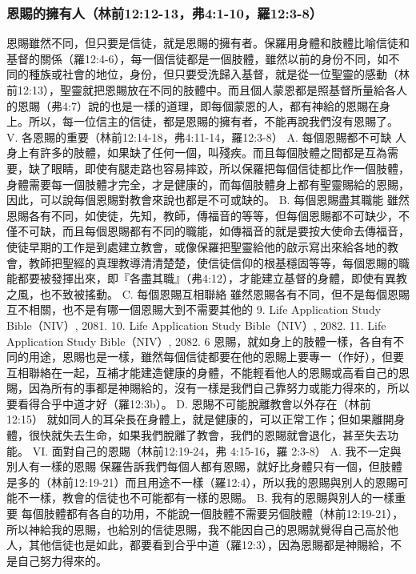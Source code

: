 \subsubsection{恩賜的擁有人（林前12:12-13，弗4:1-10，羅12:3-8）}
恩賜雖然不同，但只要是信徒，就是恩賜的擁有者。保羅用身體和肢體比喻信徒和基督的關係（羅12:4-6），每一個信徒都是一個肢體，雖然以前的身份不同，如不同的種族或社會的地位，身份，但只要受洗歸入基督，就是從一位聖靈的感動（林前12:13），聖靈就把恩賜放在不同的肢體中。而且個人蒙恩都是照基督所量給各人的恩賜（弗4:7）說的也是一樣的道理，即每個蒙恩的人，都有神給的恩賜在身上。所以，每一位信主的信徒，都是恩賜的擁有者，不能再說我們沒有恩賜了。
V. 各恩賜的重要（林前12:14-18，弗4:11-14，羅12:3-8）
A. 每個恩賜都不可缺
人身上有許多的肢體，如果缺了任何一個，叫殘疾。而且每個肢體之間都是互為需要，缺了眼睛，即使有腿走路也容易摔跤，所以保羅把每個信徒都比作一個肢體，身體需要每一個肢體才完全，才是健康的，而每個肢體身上都有聖靈賜給的恩賜，因此，可以說每個恩賜對教會來說也都是不可或缺的。
B. 每個恩賜盡其職能
雖然恩賜各有不同，如使徒，先知，教師，傳福音的等等，但每個恩賜都不可缺少，不僅不可缺，而且每個恩賜都有不同的職能，如傳福音的就是要按大使命去傳福音，使徒早期的工作是到處建立教會，或像保羅把聖靈給他的啟示寫出來給各地的教會，教師把聖經的真理教導清清楚楚，使信徒信仰的根基穩固等等，每個恩賜的職能都要被發揮出來，即『各盡其職』（弗4:12），才能建立基督的身體，即使有異教之風，也不致被搖動。
C. 每個恩賜互相聯絡
雖然恩賜各有不同，但不是每個恩賜互不相關，也不是有哪一個恩賜大到不需要其他的
9. Life Application Study Bible（NIV）, 2081.
10. Life Application Study Bible（NIV）, 2082.
11. Life Application Study Bible（NIV）, 2082.
6
恩賜，就如身上的肢體一樣，各自有不同的用途，恩賜也是一樣，雖然每個信徒都要在他的恩賜上要專一（作好），但要互相聯絡在一起，互補才能建造健康的身體，不能輕看他人的恩賜或高看自己的恩賜，因為所有的事都是神賜給的，沒有一樣是我們自己靠努力或能力得來的，所以要看得合乎中道才好（羅12:3b）。
D. 恩賜不可能脫離教會以外存在（林前 12:15）
就如同人的耳朵長在身體上，就是健康的，可以正常工作；但如果離開身體，很快就失去生命，如果我們脫離了教會，我們的恩賜就會退化，甚至失去功能。
VI. 面對自己的恩賜（林前12:19-24，弗 4:15-16，羅 2:3-8）
A. 我不一定與別人有一樣的恩賜
保羅告訴我們每個人都有恩賜，就好比身體只有一個，但肢體是多的（林前12:19-21）而且用途不一樣（羅12:4），所以我的恩賜與別人的恩賜可能不一樣，教會的信徒也不可能都有一樣的恩賜。
B. 我有的恩賜與別人的一樣重要
每個肢體都有各自的功用，不能說一個肢體不需要另個肢體（林前12:19-21），所以神給我的恩賜，也給別的信徒恩賜，我不能因自己的恩賜就覺得自己高於他人，其他信徒也是如此，都要看到合乎中道（羅12:3），因為恩賜都是神賜給，不是自己努力得來的。
